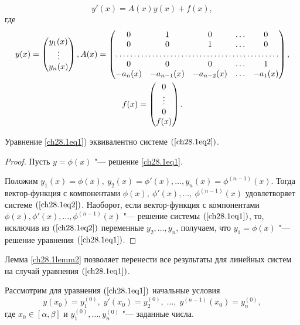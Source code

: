 \begin{equation} \label{ch28.1eq2}
y'(x) = A(x)y(x) + f(x),
\end{equation}
где
\begin{multline}
y(x) = \begin{pmatrix}
y_1(x) \\
\vdots \\
y_n(x)
\end{pmatrix},
A(x) = \begin{pmatrix}
0 & 1 & 0 & \ldots & 0 \\
0 & 0 & 1 & \ldots & 0 \\
\hdotsfor{5} \\
0 & 0 & 0 & \ldots & 1 \\
-a_n(x) & -a_{n - 1}(x) & -a_{n - 2}(x) & \ldots & -a_1(x)
\end{pmatrix}, \\
f(x) = \begin{pmatrix}
0 \\
\vdots \\ 
0 \\
f(x)
\end{pmatrix}.
\end{multline}

\begin{lemm} \label{ch28.1lemm2}
Уравнение \eqref{ch28.1eq1}) эквивалентно системе $(\ref{ch28.1eq2})$.
\end{lemm}

\begin{proof}
Пусть $y = \phi(x)$ "--- решение \eqref{ch28.1eq1}. 

Положим $y_1(x) = \phi(x), \ y_2(x) = \phi'(x), \ldots, y_n(x) = \phi^{(n - 1)}(x)$. Тогда вектор-функция с компонентами $\phi(x),\ \phi'(x),\ldots,\ \phi^{(n - 1)}(x)$ удовлетворяет системе $(\ref{ch28.1eq2})$. Наоборот, если вектор-функция с компонентами $\phi(x), \phi'(x), \ldots, \phi^{(n - 1)}(x)$ "--- решение системы $(\ref{ch28.1eq1})$, то, исключив из $(\ref{ch28.1eq2})$ переменные $y_2, \ldots, y_n$, получаем, что $y_1 = \phi(x)$ "--- решение уравнения $(\ref{ch28.1eq1})$.
\end{proof}

Лемма \ref{ch28.1lemm2} позволяет  перенести все результаты для линейных систем на случай уравнения $(\ref{ch28.1eq1})$.

Рассмотрим для уравнения $(\ref{ch28.1eq1})$ начальные условия
\begin{equation} \label{ch28.1eq3}
y(x_0) = y_1^{(0)}, \; y'(x_0) = y_2^{(0)}, \; \ldots, \; y^{(n - 1)}(x_0) = y_n^{(0)},
\end{equation}
где $x_0 \in [\alpha, \beta]$ и $y_1^{(0)}, \ldots, y_n^{(0)}$ "--- заданные числа.

